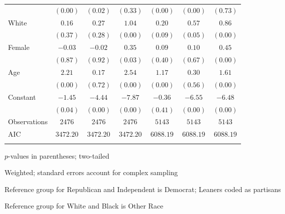 \begin{table}[!htbp]
\begin{adjustbox}{width=0.8\textwidth,center}
\begin{threeparttable}
\begin{tabular}{lccc|ccc}
                                & $(0.00)$  & $(0.02)$  & $(0.33)$  & $(0.00)$  & $(0.00)$  & $(0.73)$  \\
White                           & $0.16$    & $0.27$    & $1.04$    & $0.20$    & $0.57$    & $0.86$    \\
                                & $(0.37)$  & $(0.28)$  & $(0.00)$  & $(0.09)$  & $(0.05)$  & $(0.00)$  \\
Female                          & $-0.03$   & $-0.02$   & $0.35$    & $0.09$    & $0.10$    & $0.45$    \\
                                & $(0.87)$  & $(0.92)$  & $(0.03)$  & $(0.40)$  & $(0.67)$  & $(0.00)$  \\
Age                             & $2.21$    & $0.17$    & $2.54$    & $1.17$    & $0.30$    & $1.61$    \\
                                & $(0.00)$  & $(0.72)$  & $(0.00)$  & $(0.00)$  & $(0.56)$  & $(0.00)$  \\
Constant                        & $-1.45$   & $-4.44$   & $-7.87$   & $-0.36$   & $-6.55$   & $-6.48$   \\
                                & $(0.04)$  & $(0.00)$  & $(0.00)$  & $(0.41)$  & $(0.00)$  & $(0.00)$  \\
\hline
Observations                    & $2476$    & $2476$    & $2476$    & $5143$    & $5143$    & $5143$    \\
AIC                             & $3472.20$ & $3472.20$ & $3472.20$ & $6088.19$ & $6088.19$ & $6088.19$ \\
\hline 
\hline \\[-1.8ex] 
\end{tabular} 
\begin{tablenotes}[flushleft]
\linespread{1}
	\scriptsize
	\item \noindent $p$-values in parentheses; two-tailed
	\item \noindent Weighted; standard errors account for complex sampling
	\item \noindent Reference group for Republican and Independent is Democrat; Leaners coded as partisans
	\item \noindent Reference group for White and Black is Other Race
\end{tablenotes}
\end{threeparttable}
\end{adjustbox}
\end{table}